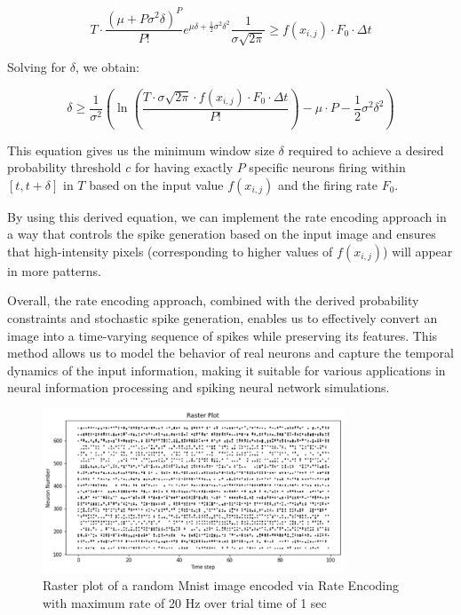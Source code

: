 \[
T \cdot \frac{(\mu + P\sigma^2\delta)^P}{P!} e^{\mu\delta + \frac{1}{2}\sigma^2 \delta^2} \frac{1}{\sigma \sqrt{2\pi}} \geq f(x_{i,j}) \cdot F_0 \cdot \Delta t
\]

Solving for \(\delta\), we obtain:

\[
\delta \geq \frac{1}{\sigma^2}\left(\ln\left(\frac{T \cdot \sigma \sqrt{2\pi} \cdot f(x_{i,j}) \cdot F_0 \cdot \Delta t}{P!}\right) - \mu \cdot P - \frac{1}{2}\sigma^2 \delta^2\right)
\]

This equation gives us the minimum window size \(\delta\) required to achieve a desired probability threshold \(c\) for having exactly \(P\) specific neurons firing within \([t, t + \delta]\) in \(T\) based on the input value \(f(x_{i,j})\) and the firing rate \(F_0\).

By using this derived equation, we can implement the rate encoding approach in a way that controls the spike generation based on the input image and ensures that high-intensity pixels (corresponding to higher values of \(f(x_{i,j})\)) will appear in more patterns.

Overall, the rate encoding approach, combined with the derived probability constraints and stochastic spike generation, enables us to effectively convert an image into a time-varying sequence of spikes while preserving its features. This method allows us to model the behavior of real neurons and capture the temporal dynamics of the input information, making it suitable for various applications in neural information processing and spiking neural network simulations.

\begin{figure}[H]
    \centering
    \includegraphics[width=0.8\textwidth]{methods/computational-models/graphs/rate-encoding-raster.png}
    \caption{Raster plot of a random Mnist image encoded via Rate Encoding with maximum rate of 20 Hz over trial time of 1 sec}
    \label{fig:rate-encoding-raster}
\end{figure}
